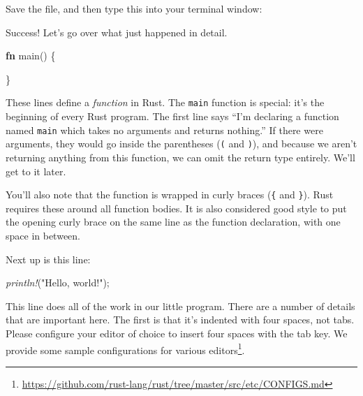 \documentclass[a4paper,]{book}
\newenvironment{Shaded}{\begin{snugshade}}{\end{snugshade}}
\newcommand{\KeywordTok}[1]{\textcolor[rgb]{0.13,0.29,0.53}{\textbf{{#1}}}}
\newcommand{\StringTok}[1]{\textcolor[rgb]{0.31,0.60,0.02}{{#1}}}
\newcommand{\CommentTok}[1]{\textcolor[rgb]{0.56,0.35,0.01}{\textit{{#1}}}}
\newcommand{\PreprocessorTok}[1]{\textcolor[rgb]{0.56,0.35,0.01}{\textit{{#1}}}}
\newcommand{\NormalTok}[1]{{#1}}
\renewcommand{\href}[2]{#2\footnote{\url{#1}}}
\begin{document}
Save the file, and then type this into your terminal window:

\begin{Shaded}
\end{Shaded}

Success! Let's go over what just happened in detail.

\begin{Shaded}
\begin{Highlighting}[]
\KeywordTok{fn} \NormalTok{main() \{}

\NormalTok{\}}
\end{Highlighting}
\end{Shaded}

These lines define a \emph{function} in Rust. The \texttt{main} function
is special: it's the beginning of every Rust program. The first line
says ``I'm declaring a function named \texttt{main} which takes no
arguments and returns nothing.'' If there were arguments, they would go
inside the parentheses (\texttt{(} and \texttt{)}), and because we
aren't returning anything from this function, we can omit the return
type entirely. We'll get to it later.

You'll also note that the function is wrapped in curly braces
(\texttt{\{} and \texttt{\}}). Rust requires these around all function
bodies. It is also considered good style to put the opening curly brace
on the same line as the function declaration, with one space in between.

Next up is this line:

\begin{Shaded}
\begin{Highlighting}[]
    \PreprocessorTok{println!}\NormalTok{(}\StringTok{"Hello, world!"}\NormalTok{);}
\end{Highlighting}
\end{Shaded}

This line does all of the work in our little program. There are a number
of details that are important here. The first is that it's indented with
four spaces, not tabs. Please configure your editor of choice to insert
four spaces with the tab key. We provide some
\href{https://github.com/rust-lang/rust/tree/master/src/etc/CONFIGS.md}{sample
configurations for various editors}.
\end{document}
